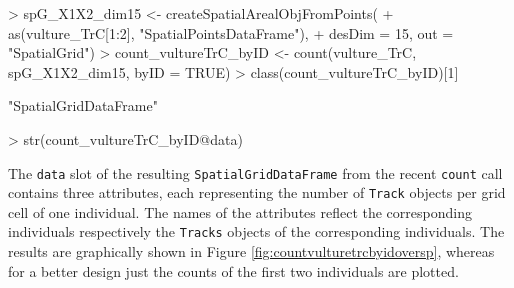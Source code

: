 \documentclass[12pt, oneside, a4paper]{scrbook}
\let\code=\texttt
\begin{document}
\begin{small}
\begin{Schunk}
\begin{Sinput}
> spG_X1X2_dim15 <- createSpatialArealObjFromPoints(
+   as(vulture_TrC[1:2], "SpatialPointsDataFrame"), 
+   desDim = 15, out = "SpatialGrid")
> count_vultureTrC_byID <- count(vulture_TrC, spG_X1X2_dim15, byID = TRUE)
> class(count_vultureTrC_byID)[1]
\end{Sinput}
\begin{Soutput}
[1] "SpatialGridDataFrame"
\end{Soutput}
\begin{Sinput}
> str(count_vultureTrC_byID@data)
\end{Sinput}
\end{Schunk}
\end{small}

\par\medskip

The \code{data} slot of the resulting \code{SpatialGridDataFrame} from the recent \code{count} call contains three attributes, each representing the number of \code{Track} objects per grid cell of one individual. The names of the attributes reflect the corresponding individuals respectively the \code{Tracks} objects of the corresponding individuals. The results are graphically shown in Figure \ref{fig:countvulturetrcbyidoversp}, whereas for a better design just the counts of the first two individuals are plotted.

\par\medskip
\end{document}

